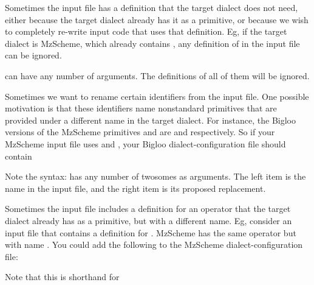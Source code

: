 

Sometimes the input file has a definition that the
target dialect does not need, either because the target
dialect already has it as a primitive, or because we
wish to completely re-write input code that uses that
definition.  Eg, if the target dialect is MzScheme,
which already contains , any definition of
 in the input file can be ignored.


 can have any number of
arguments.  The definitions of all of them will be
ignored.


Sometimes we want to rename certain identifiers from
the input file.  One possible motivation is that
these identifiers name nonstandard primitives that are
provided under a different name in the target dialect.
For instance, the Bigloo versions of the MzScheme
primitives  and
 are  and
 respectively.  So if your
MzScheme input file uses  and
, your Bigloo
dialect-configuration file should contain


Note the syntax:  has any number of
twosomes as arguments.  The left item is the name in
the input file, and the right item is its proposed
replacement.


Sometimes the input file includes a definition
for an operator that the target dialect already has as
a primitive, but with a different name.   Eg, consider
an input file that contains a definition for
.  MzScheme has the same operator but with
name .  You could add the following to
the MzScheme dialect-configuration file:


Note that this is shorthand for


